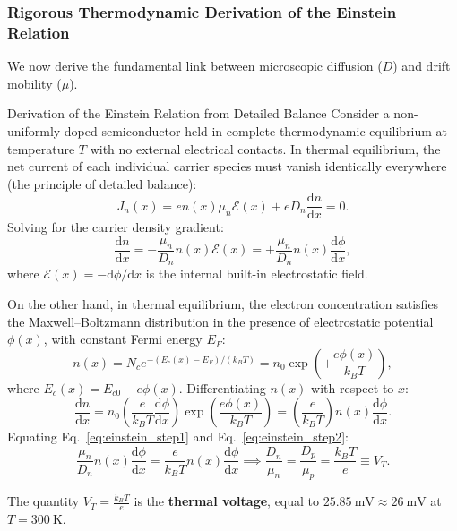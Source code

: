 \documentclass[11pt,a4paper]{article}
\newcommand{\dv}[2]{\frac{\mathrm{d}#1}{\mathrm{d}#2}}
\newcommand{\dd}{\mathrm{d}}
\begin{document}
\subsubsection{Rigorous Thermodynamic Derivation of the Einstein Relation}
We now derive the fundamental link between microscopic diffusion ($D$) and drift mobility ($\mu$).
\begin{methodbox}{Derivation of the Einstein Relation from Detailed Balance}
Consider a non-uniformly doped semiconductor held in complete thermodynamic equilibrium at temperature $T$ with no external electrical contacts. In thermal equilibrium, the net current of each individual carrier species must vanish identically everywhere (the principle of detailed balance):
\begin{equation}
    J_n(x) = e n(x) \mu_n \mathcal{E}(x) + e D_n \dv{n}{x} = 0.
\end{equation}
Solving for the carrier density gradient:
\begin{equation}
    \dv{n}{x} = -\frac{\mu_n}{D_n} n(x) \mathcal{E}(x) = +\frac{\mu_n}{D_n} n(x) \dv{\phi}{x},
    \label{eq:einstein_step1}
\end{equation}
where $\mathcal{E}(x) = -\dd\phi/\dd x$ is the internal built-in electrostatic field.

On the other hand, in thermal equilibrium, the electron concentration satisfies the Maxwell--Boltzmann distribution in the presence of electrostatic potential $\phi(x)$, with constant Fermi energy $E_F$:
\begin{equation}
    n(x) = N_c e^{-(E_c(x) - E_F)/(k_B T)} = n_0 \exp\left(+\frac{e\phi(x)}{k_B T}\right),
\end{equation}
where $E_c(x) = E_{c0} - e\phi(x)$. Differentiating $n(x)$ with respect to $x$:
\begin{equation}
    \dv{n}{x} = n_0 \left(\frac{e}{k_B T}\dv{\phi}{x}\right)\exp\left(\frac{e\phi(x)}{k_B T}\right) = \left(\frac{e}{k_B T}\right) n(x) \dv{\phi}{x}.
    \label{eq:einstein_step2}
\end{equation}
Equating Eq.~\eqref{eq:einstein_step1} and Eq.~\eqref{eq:einstein_step2}:
\begin{equation}
    \frac{\mu_n}{D_n} n(x) \dv{\phi}{x} = \frac{e}{k_B T} n(x) \dv{\phi}{x} \implies \boxed{\frac{D_n}{\mu_n} = \frac{D_p}{\mu_p} = \frac{k_B T}{e} \equiv V_T.}
    \label{eq:einstein_relation_master}
\end{equation}
\end{methodbox}
The quantity $V_T = \frac{k_B T}{e}$ is the \textbf{thermal voltage}, equal to $25.85\ \mathrm{mV} \approx 26\ \mathrm{mV}$ at $T = 300\ \mathrm{K}$.
\end{document}
